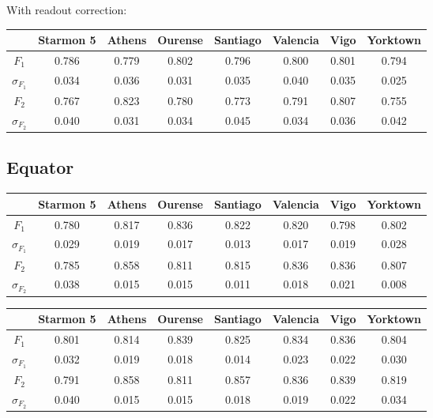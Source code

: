 With readout correction:
\begin{table}[H]
    \centering
    \begin{tabular}{|c|c|c|c|c|c|c|c|}
    \hline
    \textbf{} & \textbf{Starmon 5} & \textbf{Athens} & \textbf{Ourense} & \textbf{Santiago} & \textbf{Valencia} & \textbf{Vigo} & \textbf{Yorktown} \\ \hline
    $F_1$              & 0.786 & 0.779 & 0.802 & 0.796 & 0.800 & 0.801 & 0.794 \\ \hline
    $\sigma_{F_1}$     & 0.034 & 0.036 & 0.031 & 0.035 & 0.040 & 0.035 & 0.025 \\ \hline
    $F_2$              & 0.767 & 0.823 & 0.780 & 0.773 & 0.791 & 0.807 & 0.755 \\ \hline
    $\sigma_{F_2}$     & 0.040 & 0.031 & 0.034 & 0.045 & 0.034 & 0.036 & 0.042 \\ \hline
    \end{tabular}
\end{table}
\subsection{Equator}

\begin{table}[H]
    \centering
    \begin{tabular}{|c|c|c|c|c|c|c|c|}
    \hline
    \textbf{} & \textbf{Starmon 5} & \textbf{Athens} & \textbf{Ourense} & \textbf{Santiago} & \textbf{Valencia} & \textbf{Vigo} & \textbf{Yorktown} \\ \hline
    $F_1$              & 0.780 & 0.817 & 0.836 & 0.822 & 0.820 & 0.798 & 0.802 \\ \hline
    $\sigma_{F_1}$     & 0.029 & 0.019 & 0.017 & 0.013 & 0.017 & 0.019 & 0.028 \\ \hline
    $F_2$              & 0.785 & 0.858 & 0.811 & 0.815 & 0.836 & 0.836 & 0.807 \\ \hline
    $\sigma_{F_2}$     & 0.038 & 0.015 & 0.015 & 0.011 & 0.018 & 0.021 & 0.008 \\ \hline
    \end{tabular}
\end{table}


\begin{table}[H]
    \centering
    \begin{tabular}{|c|c|c|c|c|c|c|c|}
    \hline
    \textbf{} & \textbf{Starmon 5} & \textbf{Athens} & \textbf{Ourense} & \textbf{Santiago} & \textbf{Valencia} & \textbf{Vigo} & \textbf{Yorktown} \\ \hline
    $F_1$              & 0.801 & 0.814 & 0.839 & 0.825 & 0.834 & 0.836 & 0.804 \\ \hline
    $\sigma_{F_1}$     & 0.032 & 0.019 & 0.018 & 0.014 & 0.023 & 0.022 & 0.030 \\ \hline
    $F_2$              & 0.791 & 0.858 & 0.811 & 0.857 & 0.836 & 0.839 & 0.819 \\ \hline
    $\sigma_{F_2}$     & 0.040 & 0.015 & 0.015 & 0.018 & 0.019 & 0.022 & 0.034 \\ \hline
    \end{tabular}
\end{table}
